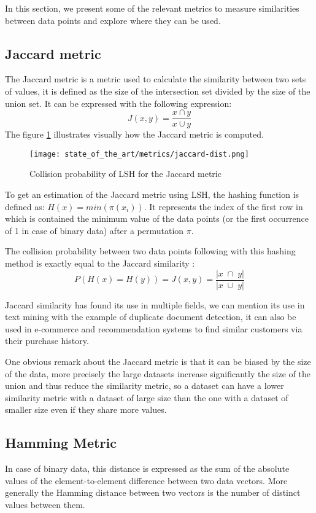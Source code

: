 In this section, we present some of the relevant metrics to measure similarities
between data points and explore where they can be used.

\subsection{Jaccard metric}
\label{subsect:jaccard_metric}
The Jaccard metric is a metric used to calculate the similarity between two sets
of values, it is defined as the size of the intersection set divided by the size
of the union set. It can be expressed with the following expression:
$$
    J(x, y) = \frac{x \cap y}{x \cup y}
$$
The figure \ref{fig:jaccard_metric} illustrates visually how the Jaccard metric
is computed.

\begin{figure}[h]
    \centering
    \texttt{[image: state\_of\_the\_art/metrics/jaccard-dist.png]}
    \caption{Collision probability of LSH for the Jaccard metric}
    \label{fig:jaccard_metric}
\end{figure}

To get an estimation of the Jaccard metric using LSH, the hashing function is
defined as: $H(x) = min ( \pi (x_i) )$. It represents the index of the first row
in which is contained the minimum value of the data points (or the first occurrence of 1
in case of binary data) after a permutation $\pi$.

The collision probability between two data points following with this hashing
method is exactly equal to the Jaccard similarity \citep{yu_yun_2022}:
$$
    P( H(x) = H(y) ) = J(x, y) = \frac{|x\; \cap \;y|}{|x\; \cup \;y|}
$$


Jaccard similarity has found its use in multiple fields, we can mention its use
in text mining with the example of duplicate document detection, it can also be
used in e-commerce and recommendation systems to find similar customers via
their purchase history.

One obvious remark about the Jaccard metric is that it can be biased by the size
of the data, more precisely the large datasets increase significantly the size
of the union and thus reduce the similarity metric, so a dataset can have a
lower similarity metric with a dataset of large size than the one with a dataset
of smaller size even if they share more values.


\subsection{Hamming Metric}
\label{subsect:hamming_metric}
In case of binary data, this distance is expressed as the sum of the absolute
values of the element-to-element difference between two data vectors. More
generally the Hamming distance between two vectors is the number of distinct
values between them.

